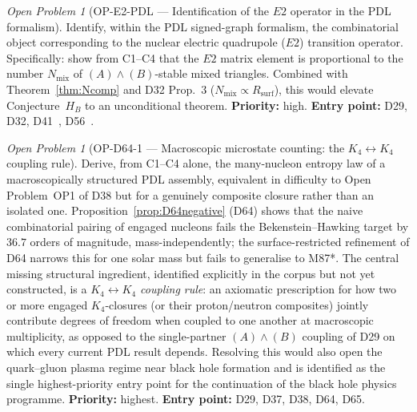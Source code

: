 \documentclass[11pt,a4paper]{article}
\theoremstyle{plain}
\theoremstyle{definition}
\theoremstyle{remark}
\newtheorem{openproblem}[theorem]{Open Problem}
\newcommand{\Kfour}{K_4}
\begin{document}
\begin{openproblem}[OP-E2-PDL --- Identification of the $E2$ operator in the PDL formalism]
\label{op:E2PDL}
Identify, within the PDL signed-graph formalism, the combinatorial object corresponding to the nuclear electric quadrupole ($E2$) transition operator. Specifically: show from C1--C4 that the $E2$ matrix element is proportional to the number $N_{\mathrm{mix}}$ of $(A)\wedge(B)$-stable mixed triangles. Combined with Theorem~\ref{thm:Ncomp} and D32 Prop.~3 ($N_{\mathrm{mix}}\propto R_{\mathrm{surf}}$), this would elevate Conjecture~$H_B$ to an unconditional theorem. \textbf{Priority:} high. \textbf{Entry point:} D29, D32, D41~\cite{D41}, D56~\cite{D56}.
\end{openproblem}

\begin{openproblem}[OP-D64-1 --- Macroscopic microstate counting: the $K_4\leftrightarrow K_4$ coupling rule]
\label{op:D64one}
Derive, from C1--C4 alone, the many-nucleon entropy law of a macroscopically structured PDL assembly, equivalent in difficulty to Open Problem~OP1 of D38 but for a genuinely composite closure rather than an isolated one. Proposition~\ref{prop:D64negative} (D64) shows that the naive combinatorial pairing of engaged nucleons fails the Bekenstein--Hawking target by $36.7$ orders of magnitude, mass-independently; the surface-restricted refinement of D64 narrows this for one solar mass but fails to generalise to M87*. The central missing structural ingredient, identified explicitly in the corpus but not yet constructed, is a \emph{$K_4\leftrightarrow K_4$ coupling rule}: an axiomatic prescription for how two or more engaged $\Kfour$-closures (or their proton/neutron composites) jointly contribute degrees of freedom when coupled to one another at macroscopic multiplicity, as opposed to the single-partner $(A)\wedge(B)$ coupling of D29 on which every current PDL result depends. Resolving this would also open the quark--gluon plasma regime near black hole formation and is identified as the single highest-priority entry point for the continuation of the black hole physics programme. \textbf{Priority:} highest. \textbf{Entry point:} D29, D37, D38, D64, D65.
\end{openproblem}
\end{document}
